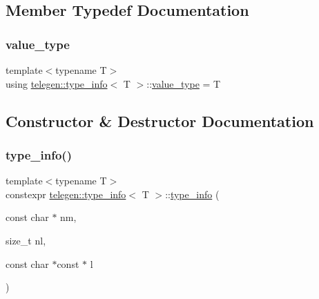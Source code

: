 \subsection{Member Typedef Documentation}
\mbox{\label{structtelegen_1_1type__info_a9d062952fc241b6fd91df2b038995eaf}} 
\subsubsection{\texorpdfstring{value\+\_\+type}{value\_type}}
{\footnotesize\ttfamily template$<$typename T$>$ \\
using \hyperlink{structtelegen_1_1type__info}{telegen\+::type\+\_\+info}$<$ T $>$\+::\hyperlink{structtelegen_1_1type__info_a9d062952fc241b6fd91df2b038995eaf}{value\+\_\+type} =  T}



\subsection{Constructor \& Destructor Documentation}
\mbox{\label{structtelegen_1_1type__info_a2f67a3b15149ac1a6a95354725f9d72a}} 
\subsubsection{\texorpdfstring{type\+\_\+info()}{type\_info()}}
{\footnotesize\ttfamily template$<$typename T$>$ \\
constexpr \hyperlink{structtelegen_1_1type__info}{telegen\+::type\+\_\+info}$<$ T $>$\+::\hyperlink{structtelegen_1_1type__info}{type\+\_\+info} (\begin{DoxyParamCaption}\item[{const char $\ast$}]{nm,  }\item[{size\+\_\+t}]{nl,  }\item[{const char $\ast$const $\ast$}]{l }\end{DoxyParamCaption})\hspace{0.3cm}{\ttfamily [inline]}}



